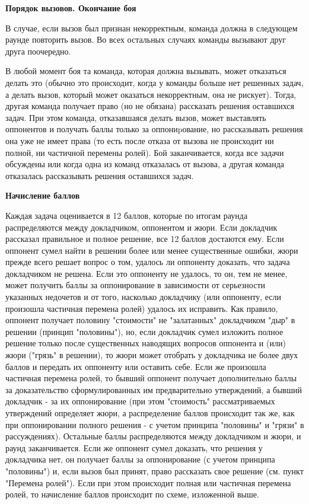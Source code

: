 \documentclass{article}
\begin{document}
\begin{center}
\textbf{Порядок вызовов. Окончание боя}
\end{center}

В случае, если вызов был признан некорректным, команда должна в следующем раунде повторить вызов. Во всех остальных случаях команды вызывают друг друга поочередно.

В любой момент боя та команда, которая должна вызывать, может отказаться делать это (обычно это происходит, когда у команды больше нет решенных задач, а делать вызов, который может оказаться некорректным, она не рискует). Тогда, другая команда получает право (но не обязана) рассказать решения оставшихся задач. При этом команда, отказавшаяся делать вызов, может выставлять оппонентов и получать баллы только за оппониpование, но рассказывать решения она уже не имеет права (то есть после отказа от вызова не происходит ни полной, ни частичной перемены ролей). Бой заканчивается, когда все задачи обсуждены или когда одна из команд отказалась от вызова, а другая команда отказалась рассказывать решения оставшихся задач.

\begin{center}
\textbf{Начисление баллов}
\end{center}

Каждая задача оценивается в 12 баллов, которые по итогам раунда распределяются между докладчиком, оппонентом и жюри. Если докладчик рассказал правильное и полное решение, все 12 баллов достаются ему. Если оппонент сумел найти в решении более или менее существенные ошибки, жюри прежде всего решает вопрос о том, удалось ли оппоненту доказать, что задача докладчиком не решена. Если это оппоненту не удалось, то он, тем не менее, может получить баллы за оппонирование в зависимости от серьезности указанных недочетов и от того, насколько докладчику (или оппоненту, если произошла частичная перемена ролей) удалось их исправить. Как правило, оппонент получает половину "стоимости" не "залатанных" докладчиком "дыр" в решении (принцип "половины"), но, если докладчик сумел изложить полное решение только после существенных наводящих вопросов оппонента и (или) жюри ("грязь" в решении), то жюри может отобрать у докладчика не более двух баллов и передать их оппоненту или оставить себе. Если же произошла частичная перемена ролей, то бывший оппонент получает дополнительно баллы за доказательство сформулированных им предварительно утверждений, а бывший докладчик - за их оппонирование (при этом "стоимость" рассматриваемых утверждений определяет жюри, а распределение баллов происходит так же, как при оппонировании полного решения - с учетом принципа "половины" и "грязи" в рассуждениях). Остальные баллы распределяются между докладчиком и жюри, и раунд заканчивается. Если же оппонент сумел доказать, что решения у докладчика нет, он получает баллы за оппонирование (с учетом принципа "половины") и, если вызов был принят, право рассказать свое решение (см. пункт "Перемена ролей"). Если при этом происходит полная или частичная перемена ролей, то начисление баллов происходит по схеме, изложенной выше.
\end{document}
